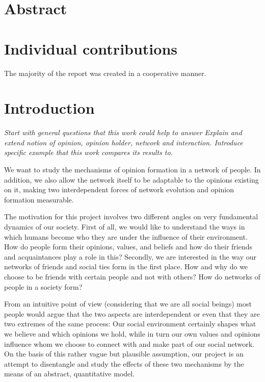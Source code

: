 \documentclass[11pt]{article}
\begin{document}
\section{Abstract}

\section{Individual contributions}

The majority of the report was created in a cooperative manner.

\section{Introduction}

\textit{Start with general questions that this work could help to answer
Explain and extend notion of opinion, opinion holder, network and interaction.
Introduce specific example that this work compares its results to.}

We want to study the mechanisms of opinion formation in a network of people. In addition, we also allow the network itself to be adaptable to the opinions existing on it, making two interdependent forces of network evolution and opinion formation measurable.

The motivation for this project involves two different angles on very fundamental dynamics of our society. First of all, we would like to understand the ways in which humans become who they are under the influence of their environment. How do people form their opinions, values, and beliefs and how do their friends and acquaintances play a role in this? Secondly, we are interested in the way our networks of friends and social ties form in the first place. How and why do we choose to be friends with certain people and not with others? How do networks of people in a society form? 

From an intuitive point of view (considering that we are all social beings) most people would argue that the two aspects are interdependent or even that they are two extremes of the same process: Our social environment certainly shapes what we believe and which opinions we hold, while in turn our own values and opinions influence whom we choose to connect with and make part of our social network. On the basis of this rather vague but plausible assumption, our project is an attempt to disentangle and study the effects of these two mechanisms by the means of an abstract, quantitative model. 
\end{document}
